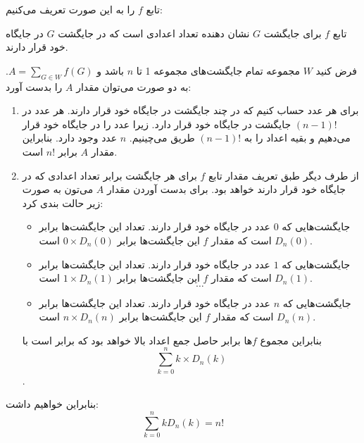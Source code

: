 \p
	تابع $f$ را به این صورت تعریف می‌کنیم:
	
	تابع $f$ برای جایگشت $G$ نشان دهنده تعداد اعدادی است که در جایگشت $G$ در جایگاه خود قرار دارند.
	
فرض کنید $W$ مجموعه تمام جایگشت‌های مجموعه 1 تا $n$ باشد و $A=\sum_{G \in W} f(G)$. به دو صورت می‌توان مقدار $A$ را بدست آورد:
	\begin{enumerate}
		\item 
		برای هر عدد حساب کنیم که در چند جایگشت در جایگاه خود قرار دارند.
		هر عدد در $(n-1)!$ جایگشت در جایگاه خود قرار دارد. زیرا عدد را در جایگاه خود قرار می‌دهیم و بقیه اعداد را به $(n-1)!$ طریق می‌چینیم. $n$ عدد وجود دارد. بنابراین مقدار $A$ برابر $n!$ است.
		
		\item
		از طرف دیگر طبق تعریف مقدار تابع $f$ برای هر جایگشت برابر تعداد اعدادی که در جایگاه خود قرار دارند خواهد بود. برای بدست آوردن مقدار $A$ می‌تون به صورت زیر حالت بندی کرد:
		
		\begin{itemize}
			\item 
			جایگشت‌هایی که $0$ عدد در جایگاه خود قرار دارند. تعداد این جایگشت‌ها برابر $D_n(0)$ است که مقدار $f$ این جایگشت‌ها برابر $0\times D_n(0)$ است.
			\item
			جایگشت‌هایی که $1$ عدد در جایگاه خود قرار دارند. تعداد این جایگشت‌ها برابر $D_n(1)$ است که مقدار $f$ این جایگشت‌ها برابر $1\times D_n(1)$ است.
			$$\dots$$
			\item
			جایگشت‌هایی که $n$ عدد در جایگاه خود قرار دارند. تعداد این جایگشت‌ها برابر $D_n(n)$ است که مقدار $f$ این جایگشت‌ها برابر $n\times D_n(n)$ است.
		\end{itemize}
	بنابراین مجموع $f$‌ها برابر حاصل جمع اعداد بالا خواهد بود که برابر است با $$\sum_{k=0}^{n} k \times D_n(k)$$.
	\end{enumerate} 
	
	
	بنابراین خواهیم داشت:
	$$\sum_{k=0}^{n} kD_n(k) = n!$$
